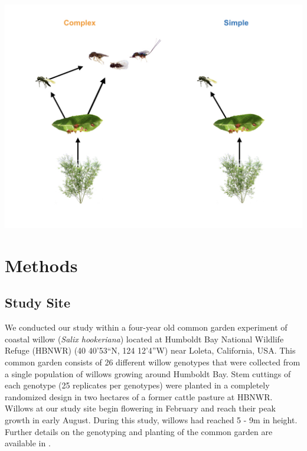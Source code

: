\documentclass[11pt,]{article}
\let\origfigure\figure
\let\endorigfigure\endfigure
\renewenvironment{figure}[1][2] {
    \expandafter\origfigure\expandafter[H]
} {
    \endorigfigure
}
\begin{document}
\begin{figure}
\centering
\includegraphics{analyses/complex_simple_foodwebs_v2.jpeg}
\caption{\label{fig:Conceptual}Experimental manipulation of food-web
complexity associated with a leaf-galling midge (\emph{Iteomyia
salicisverruca}) feeding on the willow \emph{Salix hookeriana}. Black
arrows denote the flow of energy in this network of trophic
interactions. In the complex food-web treatment, we allowed the full
suite of egg and larval parasitoids to impose selection. In the simple
food-web treatment, we used mesh bags to exclude the guild of larval
parasitoids, only allowing the egg parasitoid (\emph{Platygaster} sp.)
to impose selection. Larval parasitoids include the following species
(from left to right): \emph{Mesopolobus} sp. (Family: Pteromalidae);
\emph{Tetrastichus} sp. (Family: Eulophidae); and \emph{Torymus} sp.
(Family: Torymidae).}
\end{figure}

\section{Methods}\label{methods}

\subsection{Study Site}\label{study-site}

We conducted our study within a four-year old common garden experiment
of coastal willow (\emph{Salix hookeriana}) located at Humboldt Bay
National Wildlife Refuge (HBNWR) (40 40'53``N, 124 12'4''W) near Loleta,
California, USA. This common garden consists of 26 different willow
genotypes that were collected from a single population of willows
growing around Humboldt Bay. Stem cuttings of each genotype (25
replicates per genotypes) were planted in a completely randomized design
in two hectares of a former cattle pasture at HBNWR. Willows at our
study site begin flowering in February and reach their peak growth in
early August. During this study, willows had reached 5 - 9m in height.
Further details on the genotyping and planting of the common garden are
available in \citet{Barbour2015}.
\end{document}
